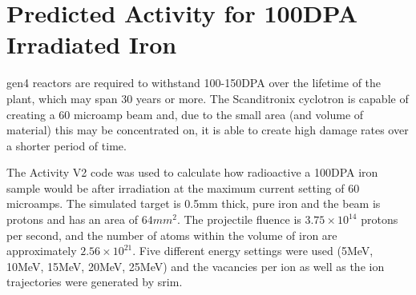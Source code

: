 \FloatBarrier


\section[100DPA Predicted Activity]{Predicted Activity for 100DPA Irradiated Iron}

\Acrlong{gen4} reactors are required to withstand 100-150DPA over the lifetime of the plant, which may span 30 years or more.  The Scanditronix cyclotron is capable of creating a 60 microamp beam and, due to the small area (and volume of material) this may be concentrated on, it is able to create high damage rates over a shorter period of time.

The Activity V2 code was used to calculate how radioactive a 100DPA iron sample would be after irradiation at the maximum current setting of 60 microamps.  The simulated target is 0.5mm thick, pure iron and the beam is protons and has an area of $64mm^2$.  The projectile fluence is $3.75 \times 10^{14}$ protons per second, and the number of atoms within the volume of iron are approximately $2.56 \times 10^{21}$.  Five different energy settings were used (5MeV, 10MeV, 15MeV, 20MeV, 25MeV) and the vacancies per ion as well as the ion trajectories were generated by \acrshort{srim}.

